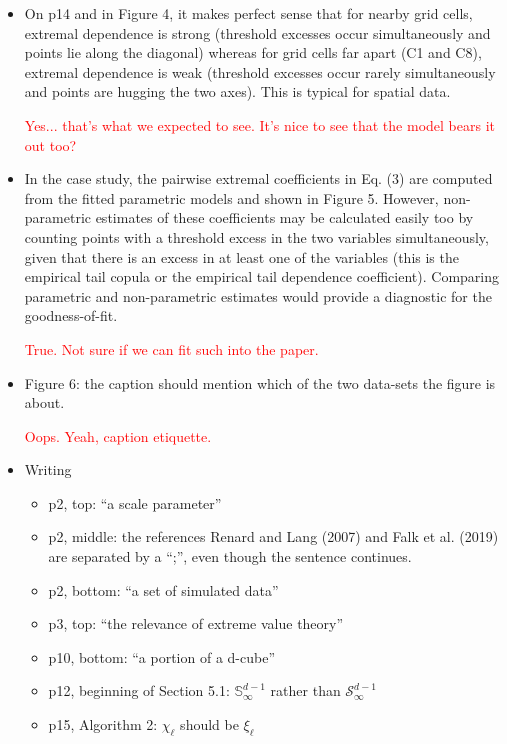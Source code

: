 \documentclass[10pt]{article}
\newcommand{\peter}[1]{\textcolor{red}{#1}}  %
\begin{document}
\begin{itemize}
    \item On p14 and in Figure 4, it makes perfect sense that for nearby grid cells, extremal dependence is strong (threshold excesses occur simultaneously and points lie along the diagonal) whereas for grid cells far apart (C1 and C8), extremal dependence is weak (threshold excesses occur rarely simultaneously and points are hugging the two axes). This is typical for spatial data.
    
    \peter{Yes...  that's what we expected to see.  It's nice to see that the model bears it out too?}
    
    \item In the case study, the pairwise extremal coefficients in Eq. (3) are computed from the fitted parametric models and shown in Figure 5. However, non-parametric estimates of these coefficients may be calculated easily too by counting points with a threshold excess in the two variables simultaneously, given that there is an excess in at least one of the variables (this is the empirical tail copula or the empirical tail dependence coefficient). Comparing parametric and non-parametric estimates would provide a diagnostic for the goodness-of-fit.
    
    \peter{True.  Not sure if we can fit such into the paper.}
    
    \item Figure 6: the caption should mention which of the two data-sets the figure is about.
    
    \peter{Oops.  Yeah, caption etiquette.}
    
    \item Writing
    \begin{itemize}
        \item p2, top: “a scale parameter”
        \item p2, middle: the references Renard and Lang (2007) and Falk et al. (2019) are separated by a “;”, even though the sentence continues.
        \item p2, bottom: “a set of simulated data”
        \item p3, top: “the relevance of extreme value theory”
        \item p10, bottom: “a portion of a d-cube”
        \item p12, beginning of Section 5.1: $\mathbb{S}_{\infty}^{d-1}$ rather than $\mathcal{S}_{\infty}^{d-1}$
        \item p15, Algorithm 2: $\chi_{\ell}$ should be $\xi_{\ell}$
    \end{itemize}
\end{itemize}



\end{document}
